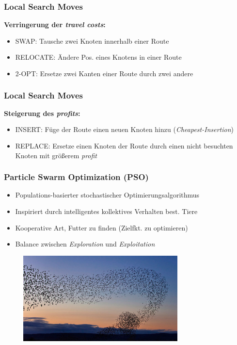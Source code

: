 \documentclass{beamer}
\begin{document}
\begin{frame}
  \frametitle{Local Search Moves}
  \textbf{Verringerung der \textit{travel costs}:}
  \begin{itemize}
    \item \textsc{SWAP}: Tausche zwei Knoten innerhalb einer Route
    \item \textsc{RELOCATE}: Ändere Pos. eines Knotens in einer Route
    \item \textsc{2-OPT}: Ersetze zwei Kanten einer Route durch zwei andere
  \end{itemize}
\end{frame}

\begin{frame}
  \frametitle{Local Search Moves}
  \textbf{Steigerung des \textit{profits}:}
  \begin{itemize}
    \item \textsc{INSERT}: Füge der Route einen neuen Knoten hinzu (\textit{Cheapest-Insertion})
    \item \textsc{REPLACE}: Ersetze einen Knoten der Route durch einen nicht besuchten Knoten mit größerem \textit{profit}
  \end{itemize}
\end{frame}

\begin{frame}
  \frametitle{Particle Swarm Optimization (PSO)}
  \begin{itemize}
    \item Populations-basierter stochastischer Optimierungsalgorithmus
    \item Inspiriert durch intelligentes kollektives Verhalten best. Tiere
    \item Kooperative Art, Futter zu finden (Zielfkt. zu optimieren)
    \item Balance zwischen \textit{Exploration} und \textit{Exploitation}
  \end{itemize}
  \begin{figure}
    \centering
    \includegraphics[width=0.75\textwidth]{img/birds.jpg}
  \end{figure}
\end{frame}
\end{document}
